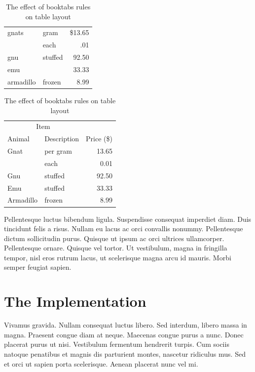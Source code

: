 \documentclass[a4paper,12pt]{book}
\begin{document}
\begin{table}[htbp]
\begin{center}
 \begin{tabular}{||l|lr||} \hline
gnats     & gram      & \$13.65 \\ \cline{2-3}
          & each      & .01 \\ \hline
gnu       & stuffed   & 92.50 \\ \cline{1-1} \cline{3-3}
emu       &           & 33.33 \\ \hline
armadillo & frozen    & 8.99 \\ \hline
\end{tabular}
\end{center}

\vspace{2ex}
\begin{center}
\begin{tabular}{@{}llr@{}} \toprule
\multicolumn{2}{c}{Item} \\ \cmidrule(r){1-2}
Animal & Description & Price (\$)\\ \midrule
Gnat  & per gram  & 13.65 \\
      & each      & 0.01 \\
Gnu   & stuffed   & 92.50 \\
Emu   & stuffed   & 33.33 \\
Armadillo & frozen & 8.99 \\ \bottomrule
\end{tabular}
\end{center}
\caption{The effect of booktabs rules on table layout}
\end{table}

Pellentesque luctus bibendum ligula. Suspendisse
consequat imperdiet diam. Duis tincidunt felis a risus. Nullam eu
lacus ac orci convallis nonummy. Pellentesque dictum sollicitudin
purus. Quisque ut ipsum ac orci ultrices ullamcorper. Pellentesque
ornare. Quisque vel tortor. Ut vestibulum, magna in fringilla tempor,
nisl eros rutrum lacus, ut scelerisque magna arcu id mauris. Morbi
semper feugiat sapien.


\section{The Implementation}


Vivamus gravida. Nullam consequat luctus libero. Sed interdum, libero
massa in magna. Praesent congue diam at neque. Maecenas congue purus a
nunc. Donec placerat purus ut nisi. Vestibulum fermentum hendrerit
turpis. Cum sociis natoque penatibus et magnis dis parturient montes,
nascetur ridiculus mus. Sed et orci ut sapien porta
scelerisque. Aenean placerat nunc vel mi. 
\end{document}
